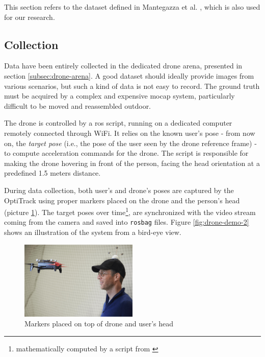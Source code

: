 This section refers to the dataset defined in Mantegazza et al. \cite{mantegazza2019visionbased}, which is also used for our research.


\subsection{Collection}
\label{subsec:control}

Data have been entirely collected in the dedicated drone arena, presented in section \ref{subsec:drone-arena}. A good dataset should ideally provide images from various scenarios, but such a kind of data is not easy to record. The ground truth must be acquired by a complex and expensive \gls{mocap} system, particularly difficult to be moved and reassembled outdoor.

\medskip

The drone is controlled by a \gls{ros} script, running on a dedicated computer remotely connected through WiFi. It relies on the known user's pose - from now on, the \textit{target pose} (i.e., the pose of the user seen by the drone reference frame) - to compute acceleration commands for the drone. The script is responsible for making the drone hovering in front of the person, facing the head orientation at a predefined 1.5 meters distance.

During data collection, both user's and drone's poses are captured by the OptiTrack using proper markers placed on the drone and the person's head (picture \ref{fig:drone-facing}). The target poses over time\footnote{mathematically computed by a script from \cite{mantegazza2018thesis}}, are synchronized with the video stream coming from the camera and saved into \texttt{rosbag} files. Figure \ref{fig:drone-demo-2} shows an illustration of the system from a bird-eye view.

\begin{figure}[!h]
	\centering
	\includegraphics[width=0.5\textwidth]{"contents/images/03-drone-facing"}
	\caption[Markers placed on top of drone and user's head]{Markers placed on top of drone and user's head \cite{mantegazza2018thesis}}
	\label{fig:drone-facing}
\end{figure}


